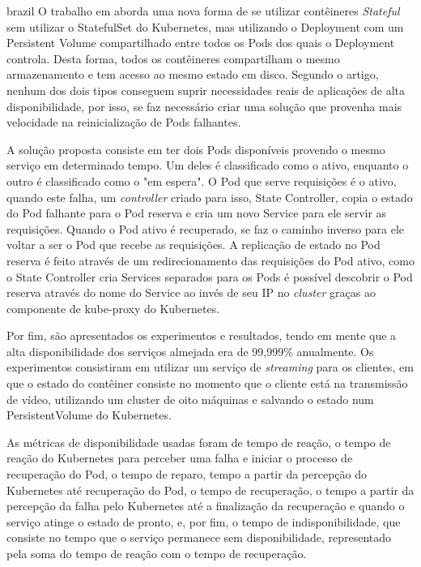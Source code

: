 \begin{otherlanguage*}{brazil}
O trabalho em \cite{vayghan2021kubernetes} aborda uma nova forma de se
utilizar contêineres \textit{Stateful} sem utilizar o StatefulSet do Kubernetes,
mas utilizando o Deployment com um Persistent Volume compartilhado entre todos
os Pods dos quais o Deployment controla. Desta forma, todos os contêineres
compartilham o mesmo armazenamento e tem acesso ao mesmo estado em disco.
Segundo o artigo, nenhum dos dois tipos conseguem suprir necessidades reais de
aplicações de alta disponibilidade, por isso, se faz necessário criar uma
solução que provenha mais velocidade na reinicialização de Pods falhantes.

A solução proposta consiste em ter dois Pods disponíveis provendo o mesmo
serviço em determinado tempo. Um deles é classificado como o ativo, enquanto
o outro é classificado como o "em espera". O Pod que serve requisições é o
ativo, quando este falha, um \textit{controller} criado para isso, State Controller,
copia o estado do Pod falhante para o Pod reserva e cria um novo Service para ele
servir as requisições. Quando o Pod ativo é recuperado, se faz o caminho inverso
para ele voltar a ser o Pod que recebe as requisições. A replicação de estado no
Pod reserva é feito através de um redirecionamento das requisições do Pod ativo,
como o State Controller cria Services separados para os Pods é possível descobrir
o Pod reserva através do nome do Service ao invés de seu IP no \textit{cluster}
graças ao componente de kube-proxy do Kubernetes.

Por fim, são apresentados os experimentos e resultados, tendo em mente que a
alta disponibilidade dos serviços almejada era de 99,999\% anualmente. Os
experimentos consistiram em utilizar um serviço de \textit{streaming} para os
clientes, em que o estado do contêiner consiste no momento que o cliente está
na transmissão de vídeo, utilizando um cluster de oito máquinas e salvando o
estado num PersistentVolume do Kubernetes.

As métricas de disponibilidade usadas foram de tempo de reação, o tempo de
reação do Kubernetes para perceber uma falha e iniciar o processo de
recuperação do Pod, o tempo de reparo, tempo a partir da percepção do Kubernetes
até recuperação do Pod, o tempo de recuperação, o tempo a partir da percepção
da falha pelo Kubernetes até a finalização da recuperação e quando o serviço
atinge o estado de pronto, e, por fim, o tempo de indisponibilidade, que
consiste no tempo que o serviço permanece sem disponibilidade, representado
pela soma do tempo de reação com o tempo de recuperação.


\end{otherlanguage*}
